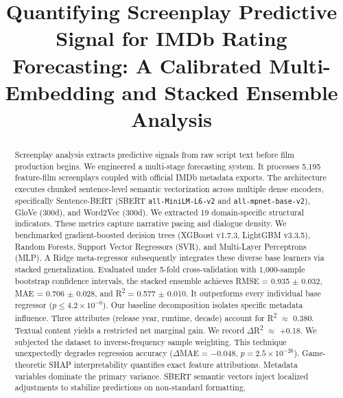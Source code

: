 \documentclass[conference]{IEEEtran}
\begin{document}
\title{Quantifying Screenplay Predictive Signal for IMDb Rating Forecasting: A Calibrated Multi-Embedding and Stacked Ensemble Analysis}

\author{
}

\maketitle

\begin{abstract}
Screenplay analysis extracts predictive signals from raw script text before film production begins. We engineered a multi-stage forecasting system. It processes 5,195 feature-film screenplays coupled with official IMDb metadata exports. The architecture executes chunked sentence-level semantic vectorization across multiple dense encoders, specifically Sentence-BERT (SBERT \texttt{all-MiniLM-L6-v2} and \texttt{all-mpnet-base-v2}), GloVe (300d), and Word2Vec (300d). We extracted 19 domain-specific structural indicators. These metrics capture narrative pacing and dialogue density. We benchmarked gradient-boosted decision trees (XGBoost v1.7.3, LightGBM v3.3.5), Random Forests, Support Vector Regressors (SVR), and Multi-Layer Perceptrons (MLP). A Ridge meta-regressor subsequently integrates these diverse base learners via stacked generalization. Evaluated under 5-fold cross-validation with 1,000-sample bootstrap confidence intervals, the stacked ensemble achieves RMSE = 0.935 $\pm$ 0.032, MAE = 0.706 $\pm$ 0.028, and R\textsuperscript{2} = 0.577 $\pm$ 0.010. It outperforms every individual base regressor ($p \le 4.2 \times 10^{-6}$). Our baseline decomposition isolates specific metadata influence. Three attributes (release year, runtime, decade) account for R\textsuperscript{2} $\approx$ 0.380. Textual content yields a restricted net marginal gain. We record $\Delta$R\textsuperscript{2} $\approx$ +0.18. We subjected the dataset to inverse-frequency sample weighting. This technique unexpectedly degrades regression accuracy ($\Delta$MAE = $-0.048$, $p = 2.5 \times 10^{-26}$). Game-theoretic SHAP interpretability quantifies exact feature attributions. Metadata variables dominate the primary variance. SBERT semantic vectors inject localized adjustments to stabilize predictions on non-standard formatting.
\end{abstract}
\end{document}
